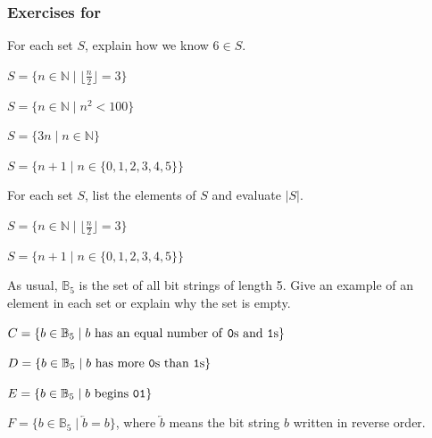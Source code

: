
\subsubsection*{Exercises for 
\subsetbuild}

\begin{exer}[\exerP] %
\label{exer_6iselement}
    For each set $S$, explain how we know $6 \in S$.
        \begin{exerpart}
            \item $S=\{n \in \mathbb{N} \mid \lfloor\frac{n}{2}\rfloor=3\}$
            \item $S = \{ n \in \mathbb{N} \mid n^2 < 100\}$
            \item $S=\{3n \mid n \in \mathbb{N}\}$
            \item $S=\{n+1 \mid n \in \{0,1,2,3,4,5\}\}$
        \end{exerpart}
\end{exer}

\begin{exer}[\exerP] %
\label{exer_list_elements}
    For each set $S$, list the elements of $S$ and evaluate $|S|$.
        \begin{exerpart}
            \item $S=\{n \in \mathbb{N} \mid \lfloor\frac{n}{2}\rfloor=3\}$
            \item $S=\{n+1 \mid n \in \{0,1,2,3,4,5\}\}$
        \end{exerpart}
\end{exer}

\begin{exer}[\exerP] %
\label{exer_set_bs}
    As usual, $\mathbb{B}_5$ is the set of all bit strings of length 5.  Give an example of an element in each set or explain why the set is empty.     
        \begin{exerpart}
            \item $C = \{ b \in \mathbb{B}_5 \mid b \text{ has an equal number of \texttt{0}s and \texttt{1}s} \}$
            \item $D = \{ b \in \mathbb{B}_5 \mid b \text{ has more \texttt{0}s than \texttt{1}s} \}$
            \item $E = \{ b \in \mathbb{B}_5 \mid b \text{ begins } \texttt{01}\}$
            \item $F = \{ b \in \mathbb{B}_5 \mid \overleftarrow{b}=b \}$, where $\overleftarrow{b}$ means the bit string $b$ written in reverse order.
        \end{exerpart}
\end{exer}

